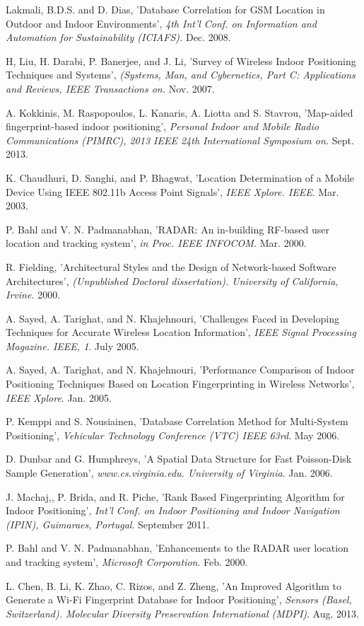 \documentclass[conference]{IEEEtran}
\begin{document}
\begin{thebibliography}{99}


 Lakmali, B.D.S. and D. Dias,
'Database Correlation for GSM Location in Outdoor and Indoor Environments',
\emph{4th Int'l Conf. on Information and Automation for Sustainability (ICIAFS).} Dec. 2008.

 H, Liu, H. Darabi, P. Banerjee, and J. Li,
'Survey of Wireless Indoor Positioning Techniques and Systems',
\emph{ (Systems, Man, and Cybernetics, Part C: Applications and Reviews, IEEE Transactions on.} Nov. 2007.

 A. Kokkinis, M. Raspopoulos, L. Kanaris, A. Liotta and S. Stavrou,
'Map-aided fingerprint-based indoor positioning',
\emph{Personal Indoor and Mobile Radio Communications (PIMRC), 2013 IEEE 24th International Symposium on.} Sept. 2013.

 K. Chaudhuri, D. Sanghi, and P. Bhagwat,
'Location Determination of a Mobile Device Using IEEE 802.11b Access Point Signals',
\emph{IEEE Xplore. IEEE}. Mar. 2003.

 P. Bahl and V. N. Padmanabhan,
'RADAR: An in-building RF-based user location and tracking system',
\emph{in Proc. IEEE INFOCOM.} Mar. 2000.

 R. Fielding,
'Architectural Styles and the Design of Network-based Software Architectures',
\emph{ (Unpublished Doctoral dissertation). University of California, Irvine.} 2000.

  A. Sayed, A. Tarighat, and N. Khajehnouri,
'Challenges Faced in Developing Techniques for Accurate Wireless Location Information',
\emph{IEEE Signal Processing Magazine. IEEE, 1}. July 2005.
 
 A. Sayed, A. Tarighat, and N. Khajehnouri,
'Performance Comparison of Indoor Positioning Techniques Based on Location Fingerprinting in Wireless Networks',
\emph{IEEE Xplore}. Jan. 2005.
 
 P. Kemppi and S. Nousiainen,
'Database Correlation Method for Multi-System Positioning',
\emph{Vehicular Technology Conference (VTC) IEEE 63rd}. May 2006.

 D. Dunbar and G. Humphreys,
'A Spatial Data Structure for Fast Poisson-Disk Sample Generation',
\emph{www.cs.virginia.edu. University of Virginia}. Jan. 2006.

 J. Machaj,, P. Brida, and R. Piche,
'Rank Based Fingerprinting Algorithm for Indoor Positioning',
\emph{Int'l Conf. on Indoor Positioning and Indoor Navigation (IPIN), Guimaraes, Portugal}. September 2011.

 P. Bahl and V. N. Padmanabhan,
'Enhancements to the RADAR user location and tracking system',
\emph{Microsoft Corporation}. Feb. 2000.

 L. Chen, B. Li, K. Zhao, C. Rizos, and Z. Zheng,
'An Improved Algorithm to Generate a Wi-Fi Fingerprint Database for Indoor Positioning',
\emph{Sensors (Basel, Switzerland). Molecular Diversity Preservation International (MDPI)}. Aug. 2013.


\end{thebibliography}
\end{document}
